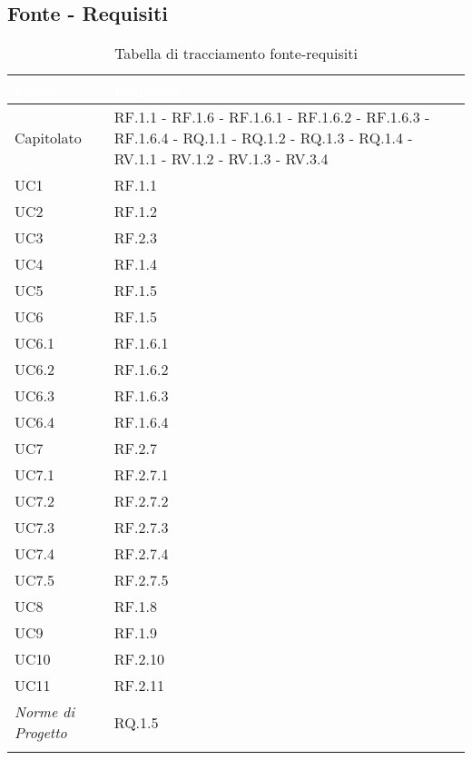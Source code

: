\subsection{Fonte - Requisiti}
\begin{center}
  \centering
  \begin{longtable}{|C{6cm}|C{6cm}|}
    \hline
    \textcolor[HTML]{FFFFFF}{\textbf{Fonte}} & \textcolor[HTML]{FFFFFF}{\textbf{Requisiti}} \\ \hline
    Capitolato & RF.1.1 - RF.1.6 - RF.1.6.1 - RF.1.6.2 - RF.1.6.3 - RF.1.6.4 - RQ.1.1 - RQ.1.2 - RQ.1.3 - RQ.1.4 - RV.1.1 - RV.1.2 - RV.1.3 - RV.3.4 \\ \hline
    UC1 & RF.1.1 \\ \hline
    UC2 & RF.1.2 \\ \hline
    UC3 & RF.2.3 \\ \hline
    UC4 & RF.1.4 \\ \hline
    UC5 & RF.1.5 \\ \hline
    UC6 & RF.1.5 \\ \hline
    UC6.1 & RF.1.6.1 \\ \hline
    UC6.2 & RF.1.6.2 \\ \hline
    UC6.3 & RF.1.6.3 \\ \hline
    UC6.4 & RF.1.6.4 \\ \hline
    UC7 & RF.2.7 \\ \hline
    UC7.1 & RF.2.7.1 \\ \hline
    UC7.2 & RF.2.7.2 \\ \hline
    UC7.3 & RF.2.7.3 \\ \hline
    UC7.4 & RF.2.7.4 \\ \hline
    UC7.5 & RF.2.7.5 \\ \hline
    UC8 & RF.1.8 \\ \hline
    UC9 & RF.1.9 \\ \hline
    UC10 & RF.2.10 \\ \hline
    UC11 & RF.2.11 \\ \hline
    \textit{Norme di Progetto} & RQ.1.5 \\ \hline

    \caption{Tabella di tracciamento fonte-requisiti}
  \end{longtable}
\end{center}

